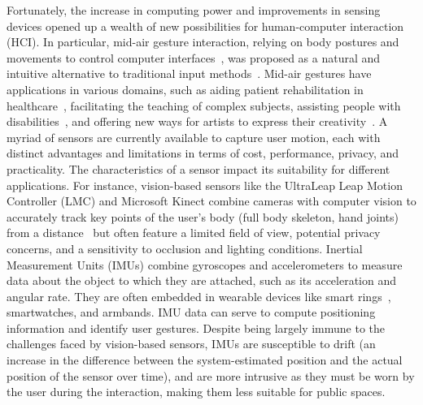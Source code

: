 Fortunately, the increase in computing power and improvements in sensing devices opened up a wealth of new possibilities for human-computer interaction (HCI). 
In particular, mid-air gesture interaction, \ie relying on body postures and movements to control computer interfaces~\cite{Koutsabasis:2019}, was proposed as a natural and intuitive alternative to traditional input methods~\cite{Vatavu:2014b,Huang:2019}.
%
Mid-air gestures have applications in various domains, such as aiding patient rehabilitation in healthcare~\cite{Munroe:2016}, facilitating the teaching of complex subjects, assisting people with disabilities~\cite{Creed:2018,Munroe:2016}, and offering new ways for artists to express their creativity~\cite{Creed:2018,Krishnamurthy:2015}.
% 
A myriad of sensors are currently available to capture user motion, each with distinct advantages and limitations in terms of cost, performance, privacy, and practicality. The characteristics of a sensor impact its suitability for different applications. 
%
For instance, vision-based sensors like the UltraLeap Leap Motion Controller (LMC) and Microsoft Kinect combine cameras with computer vision to accurately track key points of the user's body (\eg full body skeleton, hand joints) from a distance~\cite{Weichert:2013,DeSmedt:2017} but often feature a limited field of view, potential privacy concerns, and a sensitivity to occlusion and lighting conditions.
%
Inertial Measurement Units (IMUs) combine gyroscopes and accelerometers to measure data about the object to which they are attached, such as its acceleration and angular rate. 
They are often embedded in wearable devices like smart rings~\cite{Gheran:2018}, smartwatches, and armbands. IMU data can serve to compute positioning information and identify user gestures. 
Despite being largely immune to the challenges faced by vision-based sensors, IMUs are susceptible to drift (\ie an increase in the difference between the system-estimated position and the actual position of the sensor over time), and are more intrusive as they must be worn by the user during the interaction, making them less suitable for public spaces.

